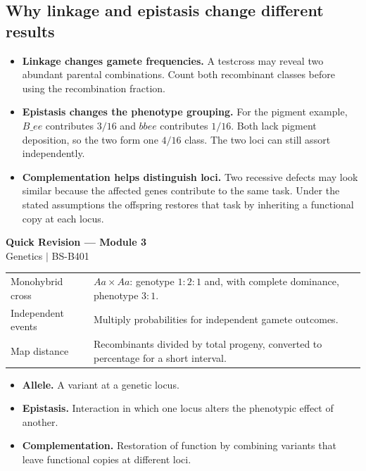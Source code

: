 \documentclass[12pt,a4paper]{article}
\renewcommand{\arraystretch}{1.45}
\begin{document}
\subsection{Why linkage and epistasis change different results}
\begin{itemize}[leftmargin=*, itemsep=2pt]
  \item \textbf{Linkage changes gamete frequencies.} A testcross may reveal two abundant parental combinations. Count both recombinant classes before using the recombination fraction.
  \item \textbf{Epistasis changes the phenotype grouping.} For the pigment example, $B\_ee$ contributes $3/16$ and $bbee$ contributes $1/16$. Both lack pigment deposition, so the two form one $4/16$ class. The two loci can still assort independently.
  \item \textbf{Complementation helps distinguish loci.} Two recessive defects may look similar because the affected genes contribute to the same task. Under the stated assumptions the offspring restores that task by inheriting a functional copy at each locus.
\end{itemize}

\newpage
\begin{center}
  {\large\bfseries\color{myred} Quick Revision --- Module 3}\\[3pt]
  {\small\color{mydark} Genetics $|$ BS-B401}
\end{center}
\noindent{\color{myred}\rule{\linewidth}{1.2pt}}\par\vspace{4pt}

\begin{tcolorbox}[formulabox, title={Key Concepts at a Glance}]
\renewcommand{\arraystretch}{1.35}
\noindent\begin{tabularx}{\linewidth}{B{4.5cm}Y}
Monohybrid cross & $Aa\times Aa$: genotype $1:2:1$ and, with complete dominance, phenotype $3:1$. \\[3pt]
Independent events & Multiply probabilities for independent gamete outcomes. \\[3pt]
Map distance & Recombinants divided by total progeny, converted to percentage for a short interval. \\[3pt]
\end{tabularx}\par
\end{tcolorbox}

\begin{tcolorbox}[defbox, title={One-Line Definitions}]
\begin{itemize}[leftmargin=*, itemsep=3pt, topsep=4pt]
  \item \textbf{Allele.} A variant at a genetic locus.
  \item \textbf{Epistasis.} Interaction in which one locus alters the phenotypic effect of another.
  \item \textbf{Complementation.} Restoration of function by combining variants that leave functional copies at different loci.
\end{itemize}
\end{tcolorbox}
\end{document}
